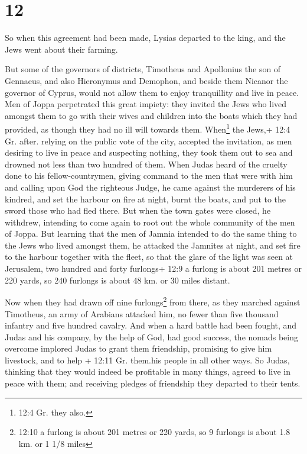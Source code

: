\hypertarget{section-11}{%
\section{12}\label{section-11}}

 So when this agreement had been made, Lysias departed to
the king, and the Jews went about their farming.

 But some of the governors of districts, Timotheus and
Apollonius the son of Gennaeus, and also Hieronymus and Demophon, and
beside them Nicanor the governor of Cyprus, would not allow them to
enjoy tranquillity and live in peace.  Men of Joppa
perpetrated this great impiety: they invited the Jews who lived amongst
them to go with their wives and children into the boats which they had
provided, as though they had no ill will towards them. 
When\footnote{12:4 Gr. they also.} the Jews,+ 12:4 Gr. after. relying on
the public vote of the city, accepted the invitation, as men desiring to
live in peace and suspecting nothing, they took them out to sea and
drowned not less than two hundred of them.  When Judas heard
of the cruelty done to his fellow-countrymen, giving command to the men
that were with him  and calling upon God the righteous
Judge, he came against the murderers of his kindred, and set the harbour
on fire at night, burnt the boats, and put to the sword those who had
fled there.  But when the town gates were closed, he
withdrew, intending to come again to root out the whole community of the
men of Joppa.  But learning that the men of Jamnia intended
to do the same thing to the Jews who lived amongst them,  he
attacked the Jamnites at night, and set fire to the harbour together
with the fleet, so that the glare of the light was seen at Jerusalem,
two hundred and forty furlongs+ 12:9 a furlong is about 201 metres or
220 yards, so 240 furlongs is about 48 km. or 30 miles distant.

 Now when they had drawn off nine furlongs\footnote{12:10 a
  furlong is about 201 metres or 220 yards, so 9 furlongs is about 1.8
  km. or 1 1/8 miles} from there, as they marched against Timotheus, an
army of Arabians attacked him, no fewer than five thousand infantry and
five hundred cavalry.  And when a hard battle had been
fought, and Judas and his company, by the help of God, had good success,
the nomads being overcome implored Judas to grant them friendship,
promising to give him livestock, and to help + 12:11 Gr. them.his people
in all other ways.  So Judas, thinking that they would
indeed be profitable in many things, agreed to live in peace with them;
and receiving pledges of friendship they departed to their tents.

